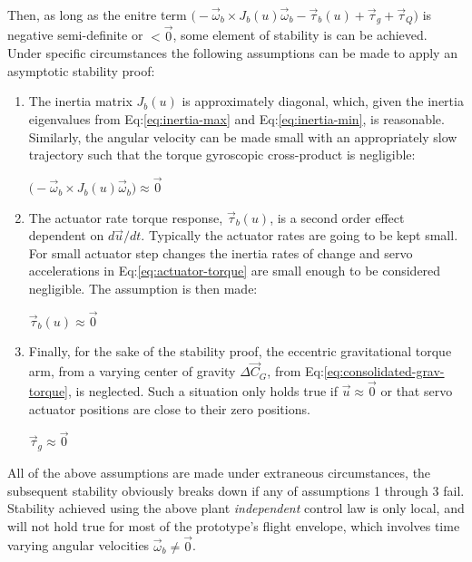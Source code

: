 Then, as long as the enitre term $\big(-\vec{\omega}_b\times J_b(u)\vec{\omega}_b-\vec{\tau}_b(u)+\vec{\tau}_g+\vec{\tau}_Q\big)$ is negative semi-definite or $<\vec{0}$, some element of stability is can be achieved. Under specific circumstances the following assumptions can be made to apply an asymptotic stability proof:
\vspace{-10pt}
\begin{enumerate}[itemsep=0em]
\item The inertia matrix $J_b(u)$ is approximately diagonal, which, given the inertia eigenvalues from Eq:\ref{eq:inertia-max} and Eq:\ref{eq:inertia-min}, is reasonable. Similarly, the angular velocity can be made small with an appropriately slow trajectory such that the torque gyroscopic cross-product is negligible:
\begin{center}
\vspace{-10pt}
$\big(-\vec{\omega}_b\times J_b(u)\vec{\omega}_b\big)\approx\vec{0}$
\vspace{-8pt}
\end{center}
\item The actuator rate torque response, $\vec{\tau}_b(u)$, is a second order effect dependent on $d\vec{u}/dt$. Typically the actuator rates are going to be kept small. For small actuator step changes the inertia rates of change and servo accelerations in Eq:\ref{eq:actuator-torque} are small enough to be considered negligible. The assumption is then made:
\begin{center}
\vspace{-10pt}
$\vec{\tau}_b(u)\approx\vec{0}$
\vspace{-8pt}
\end{center}
\item Finally, for the sake of the stability proof, the eccentric gravitational torque arm, from a varying center of gravity $\Delta\vec{C}_G$, from Eq:\ref{eq:consolidated-grav-torque}, is neglected. Such a situation only holds true if $\vec{u}\approx\vec{0}$ or that servo actuator positions are close to their zero positions.
\begin{center}
\vspace{-10pt}
$\vec{\tau}_g\approx\vec{0}$
\vspace{-8pt}
\end{center}
\end{enumerate}
All of the above assumptions are made under extraneous circumstances, the subsequent stability obviously breaks down if any of assumptions 1 through 3 fail. Stability achieved using the above plant \emph{independent} control law is only local, and will not hold true for most of the prototype's flight envelope, which involves time varying angular velocities $\vec{\omega}_b\not = \vec{0}$. 

